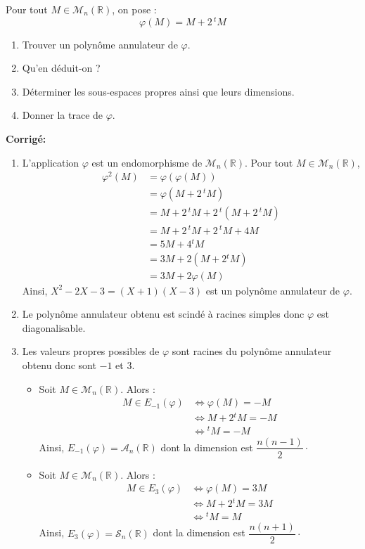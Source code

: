 \documentclass[a4paper,twoside,french,10pt]{VcCours}
\newcommand{\corr}{\textbf{Corrigé:}}
\begin{document}
\begin{Exercice}{}  Pour tout $M \in \mathcal{M}_n(\mathbb{R})$, on pose :
$$ \varphi(M) = M +2 \, {}^t M$$
\begin{enumerate}
\item Trouver un polynôme annulateur de $\varphi$.
\item Qu'en déduit-on ?
\item Déterminer les sous-espaces propres ainsi que leurs dimensions.
\item Donner la trace de $\varphi$.
\end{enumerate}
\end{Exercice}

\corr 

\begin{enumerate}
\item L'application $\varphi$ est un endomorphisme de $\mathcal{M}_n(\mathbb{R})$. Pour tout $M \in \mathcal{M}_n(\mathbb{R})$,
\begin{align*}
\varphi^2(M) & = \varphi(\varphi(M)) \\
& =  \varphi(M +2 \, {}^t M) \\
& = M +2 \, {}^t M +2 \, {}^t (M +2 \, {}^t M) \\
& = M +2 \, {}^t M +2 \, {}^t M +4M \\
& = 5M + 4{}^t M \\
& = 3M + 2(M +2{}^t M) \\
& = 3M + 2\varphi(M)
\end{align*}
Ainsi, $X^2-2X-3=(X+1)(X-3)$ est un polynôme annulateur de $\varphi$.
\item Le polynôme annulateur obtenu est scindé à racines simples donc $\varphi$ est diagonalisable.
\item Les valeurs propres possibles de $\varphi$ sont racines du polynôme annulateur obtenu donc sont $-1$ et $3$.
\begin{itemize}
\item Soit $M \in \mathcal{M}_n(\mathbb{R})$. Alors :
\begin{align*}
M \in E_{-1}(\varphi) & \Longleftrightarrow \varphi(M)=-M \\
& \Longleftrightarrow M +2{}^t M = -M \\
& \Longleftrightarrow {}^t M= - M 
\end{align*}
Ainsi, $E_{-1}(\varphi) = \mathcal{A}_n(\mathbb{R})$ dont la dimension est $\dfrac{n(n-1)}{2} \cdot$
\item Soit $M \in \mathcal{M}_n(\mathbb{R})$. Alors :
\begin{align*}
M \in E_{3}(\varphi) & \Longleftrightarrow \varphi(M)=3M \\
& \Longleftrightarrow M +2{}^t M = 3M \\
& \Longleftrightarrow {}^t M=  M 
\end{align*}
Ainsi, $E_{3}(\varphi) = \mathcal{S}_n(\mathbb{R})$ dont la dimension est $\dfrac{n(n+1)}{2}\cdot$
\end{itemize}


\end{enumerate}
\end{document}
